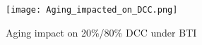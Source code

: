\begin{figure}
    \centering
     \texttt{[image: Aging\_impacted\_on\_DCC.png]} %
    \caption{Aging impact on 20\%/80\% DCC under BTI}
    \label{fig:exp4}
\end{figure}